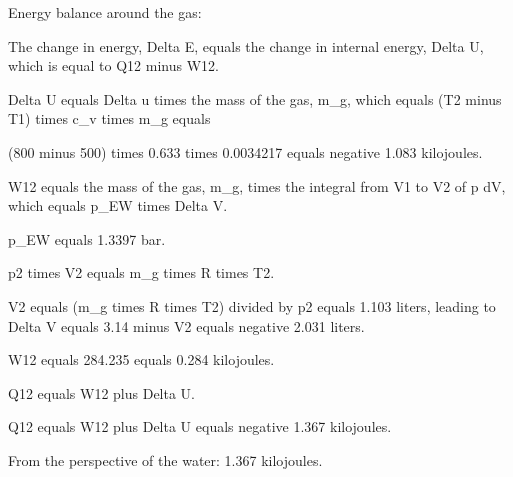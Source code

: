 Energy balance around the gas:

The change in energy, Delta E, equals the change in internal energy, Delta U, which is equal to Q12 minus W12.

Delta U equals Delta u times the mass of the gas, m_g, which equals (T2 minus T1) times c_v times m_g equals

(800 minus 500) times 0.633 times 0.0034217 equals negative 1.083 kilojoules.

W12 equals the mass of the gas, m_g, times the integral from V1 to V2 of p dV, which equals p_EW times Delta V.

p_EW equals 1.3397 bar.

p2 times V2 equals m_g times R times T2.

V2 equals (m_g times R times T2) divided by p2 equals 1.103 liters, leading to Delta V equals 3.14 minus V2 equals negative 2.031 liters.

W12 equals 284.235 equals 0.284 kilojoules.

Q12 equals W12 plus Delta U.

Q12 equals W12 plus Delta U equals negative 1.367 kilojoules.

From the perspective of the water: 1.367 kilojoules.